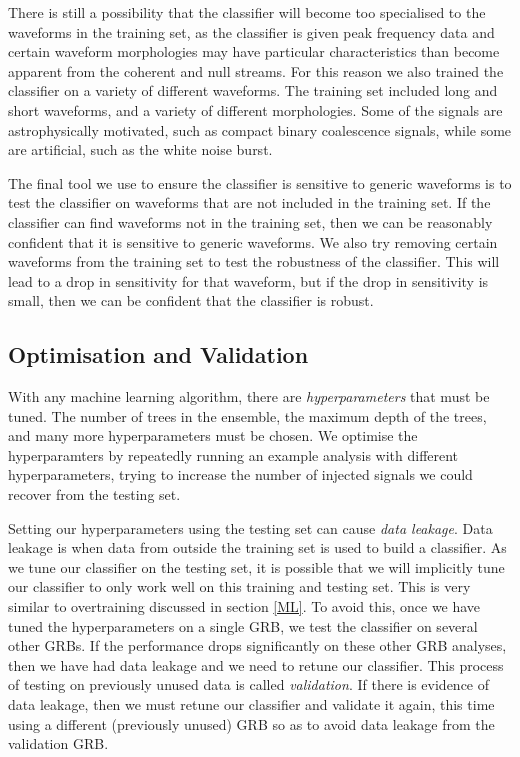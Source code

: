 \documentclass[12pt,twoside,a4paper]{report}
\begin{document}
There is still a possibility that the classifier will become too specialised to the waveforms in the training set, as the classifier is given peak frequency data and certain waveform morphologies may have particular characteristics than become apparent from the coherent and null streams. For this reason we also trained the classifier on a variety of different waveforms. The training set included long and short waveforms, and a variety of different morphologies. Some of the signals are astrophysically motivated, such as compact binary coalescence signals, while some are artificial, such as the white noise burst.

The final tool we use to ensure the classifier is sensitive to generic waveforms is to test the classifier on waveforms that are not included in the training set. If the classifier can find waveforms not in the training set, then we can be reasonably confident that it is sensitive to generic waveforms. We also try removing certain waveforms from the training set to test the robustness of the classifier. This will lead to a drop in sensitivity for that waveform, but if the drop in sensitivity is small, then we can be confident that the classifier is robust. 

\subsection{Optimisation and Validation} \label{opt}
With any machine learning algorithm, there are \textit{hyperparameters} that must be tuned. The number of trees in the ensemble, the maximum depth of the trees, and many more hyperparameters must be chosen. We optimise the hyperparamters by repeatedly running an example analysis with different hyperparameters, trying to increase the number of injected signals we could recover from the testing set. 

Setting our hyperparameters using the testing set can cause \textit{data leakage}. Data leakage is when data from outside the training set is used to build a classifier. As we tune our classifier on the testing set, it is possible that we will implicitly tune our classifier to only work well on this training and testing set. This is very similar to overtraining discussed in section \ref{ML}. To avoid this, once we have tuned the hyperparameters on a single GRB, we test the classifier on several other GRBs. If the performance drops significantly on these other GRB analyses, then we have had data leakage and we need to retune our classifier. This process of testing on previously unused data is called \textit{validation}. If there is evidence of data leakage, then we must retune our classifier and validate it again, this time using a different (previously unused) GRB so as to avoid data leakage from the validation GRB. 
\end{document}
